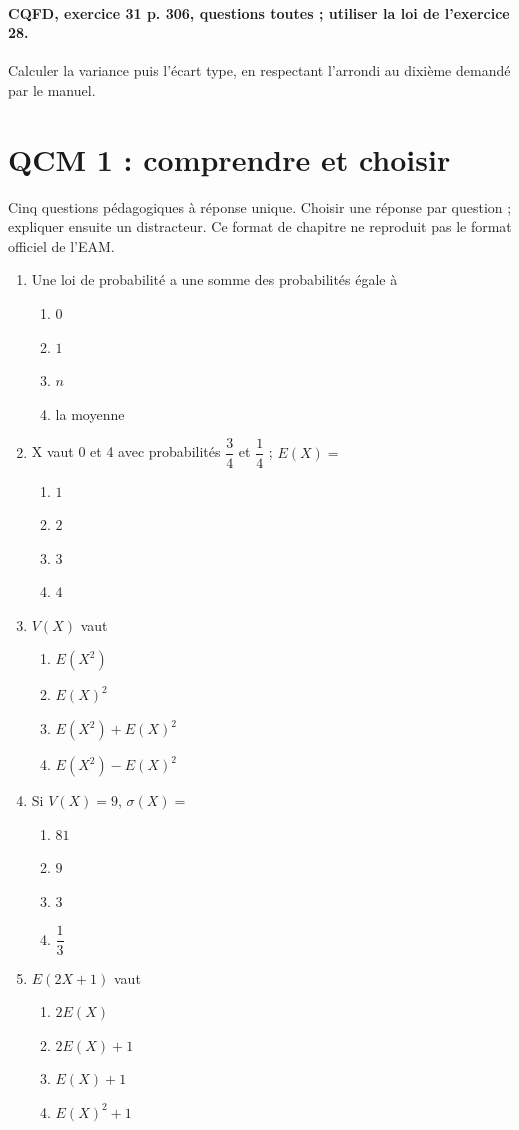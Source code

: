 \paragraph{CQFD, exercice 31 p. 306, questions toutes ; utiliser la loi de l’exercice 28.}\label{C08-M2} Calculer la variance puis l’écart type, en respectant l’arrondi au dixième demandé par le manuel.
\begingroup\small
\mxnewpage\section*{QCM 1 : comprendre et choisir}\label{C08-Q1}
Cinq questions pédagogiques à réponse unique. Choisir une réponse par question ; expliquer ensuite un distracteur. Ce format de chapitre ne reproduit pas le format officiel de l’EAM.
\begin{enumerate}
\item Une loi de probabilité a une somme des probabilités égale à
\begin{enumerate}[label=\Alph*.,itemsep=2pt]
\item $0$
\item $1$
\item $n$
\item la moyenne
\end{enumerate}
\item X vaut 0 et 4 avec probabilités $\dfrac{3}{4}$ et $\dfrac{1}{4}$ ; $E(X)=$
\begin{enumerate}[label=\Alph*.,itemsep=2pt]
\item $1$
\item $2$
\item $3$
\item $4$
\end{enumerate}
\item $V(X)$ vaut
\begin{enumerate}[label=\Alph*.,itemsep=2pt]
\item $E(X^2)$
\item $E(X)^2$
\item $E(X^2)+E(X)^2$
\item $E(X^2)-E(X)^2$
\end{enumerate}
\item Si $V(X)=9$, $\sigma(X)=$
\begin{enumerate}[label=\Alph*.,itemsep=2pt]
\item $81$
\item $9$
\item $3$
\item $\dfrac{1}{3}$
\end{enumerate}
\item $E(2X+1)$ vaut
\begin{enumerate}[label=\Alph*.,itemsep=2pt]
\item $2E(X)$
\item $2E(X)+1$
\item $E(X)+1$
\item $E(X)^2+1$
\end{enumerate}
\end{enumerate}
